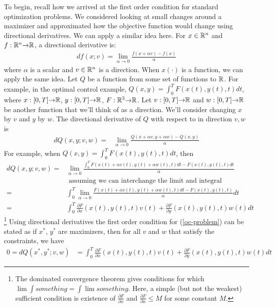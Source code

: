 To begin, recall how we arrived at the first order condition for
standard optimization problems. We considered looking at small changes
around a maximizer and approximated how the objective function would
change using directional derivatives. We can apply a similar idea
here. For $x \in \mathbb{R}^n$ and $f: \mathbb{R}^n {\rightarrow} \mathbb{R}$, a directional derivative
is:
\begin{align*}
  df(x;v) = \lim_{\alpha \to 0} \frac{f(x + \alpha v)-f(x)}{\alpha}
\end{align*}
where $\alpha$ is a scalar and $v \in \mathbb{R}^n$ is a direction. When
$x(\cdot)$ is a function, we can apply the same idea. Let $Q$ be a
function from some set of functions to $\mathbb{R}$. For example, in the
optimal control example, $Q(x,y) = \int_0^T F(x(t),y(t),t)dt$, where
$x:[0,T] {\rightarrow} \mathbb{R}$, $y:[0,T] {\rightarrow} \mathbb{R}$, $F:\mathbb{R}^3 {\rightarrow} \mathbb{R}$. Let
$v:[0,T] {\rightarrow} \mathbb{R}$ and $w:[0,T] {\rightarrow} \mathbb{R}$ be another function that we'll
think of as a direction. We'll consider changing $x$ by $v$ and $y$ by
$w$. The directional derivative of $Q$ with respect to in direction
$v,w$ is
\begin{align*}
  dQ(x,y;v,w) = & \lim_{\alpha \to 0} \frac{Q(x+\alpha v, y + \alpha w) -
  Q(x,y)}{\alpha} 
\end{align*}
For example, when $Q(x,y) = \int_0^T F(x(t),y(t),t)dt$, then
\begin{align*}
  dQ(x,y;v,w) =  & \lim_{\alpha \to 0} \frac{\int_0^T F(x(t) + \alpha
                   v(t),y(t) + \alpha w(t),t)dt -  F(x(t),y(t),t)dt} {\alpha} \\
  & \text{ assuming we can interchange the limit and integral } \\
  = & \int_0^T \lim_{\alpha \to 0} \frac{F(x(t) + \alpha
                   v(t),y(t) + \alpha w(t),t)dt -  F(x(t),y(t),t)} {\alpha} dt \\
  = & \int_0^T \frac{\partial F}{\partial x}(x(t),y(t),t)v(t) +
      \frac{\partial F}{\partial y}(x(t),y(t),t) w(t) dt
\end{align*}
\footnote{The dominated convergence theorem gives conditions for which
  $\lim \int something = \int \lim something$. Here, a simple (but not
  the weakest) sufficient condition is existence of 
  $\frac{\partial F}{\partial x}$ and
  $\frac{\partial F}{\partial x} \leq M$ for some constant $M$.}
Using directional derivatives the first order condition for
(\ref{oc-problem}) can be stated as if $x^*$, $y^*$ are maximizers,
then for all $v$ and $w$ that satisfy the constraints, we have
\begin{align}
  0 = dQ(x^*,y^*;v,w) & = \int_0^T \frac{\partial F}{\partial x}(x(t),y(t),t)v(t) +
      \frac{\partial F}{\partial y}(x(t),y(t),t) w(t) dt \label{xfoc}
\end{align}
